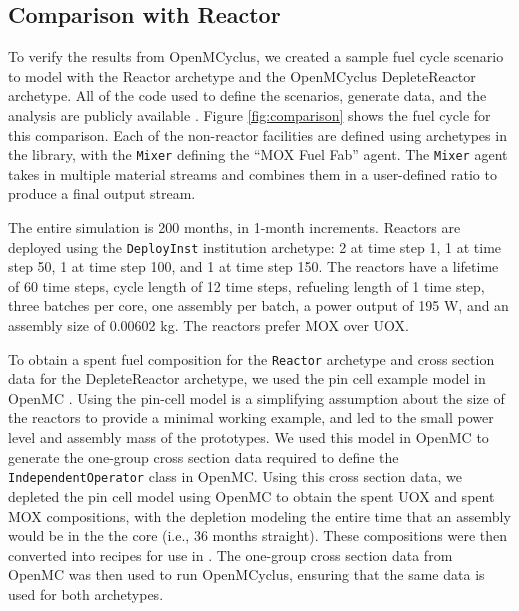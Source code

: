 \subsection{Comparison with \Cycamore Reactor}
To verify the results from OpenMCyclus, we created a sample fuel cycle 
scenario to model with the \Cycamore Reactor archetype and the 
OpenMCyclus DepleteReactor archetype. All of the code used to define the 
scenarios, generate data, and the analysis are publicly available 
\cite{bachmann_openmcyclus_2023}. Figure \ref{fig:comparison} 
shows the fuel cycle for this comparison. Each of the non-reactor 
facilities are defined 
using archetypes in the \Cycamore library, with the \Cycamore \texttt{Mixer}
defining the ``MOX Fuel Fab'' agent. The \texttt{Mixer} agent takes in multiple 
material streams and combines them in a user-defined ratio to produce 
a final output stream. 



The entire simulation is 200 months, in 1-month increments. Reactors are 
deployed using the 
\Cycamore \texttt{DeployInst} institution archetype: 2 at time step 1, 
1 at time step 
50, 1 at time step 100, and 1 at time step 150. The reactors have a lifetime 
of 60 time steps, cycle length of 12 time steps, refueling length of 1 
time step, three batches per core, one assembly per batch, a power output of 
195 W, and an assembly size of 0.00602 kg. The reactors prefer MOX over UOX. 
 
To obtain a spent fuel composition for the \Cycamore \texttt{Reactor} 
archetype and cross section data for the DepleteReactor archetype, we 
used the pin cell example model in OpenMC \cite{noauthor_modeling_nodate}. 
Using the pin-cell model is a simplifying assumption about the size of 
the reactors to provide a minimal working example, 
and led to the small power level and assembly mass of the prototypes. 
We used this model in OpenMC to generate the one-group cross 
section data required to define 
the \texttt{IndependentOperator} class 
in OpenMC. Using this cross section data, we depleted the pin cell 
model using OpenMC to obtain the spent UOX and 
spent MOX compositions, with the depletion modeling the entire time that 
an assembly would be in the the core (i.e., 36 months straight). 
These compositions were then converted into recipes for use in 
\Cyclus.
The one-group cross section data from OpenMC was then used to run 
OpenMCyclus, ensuring that the same data is used for both archetypes.  

